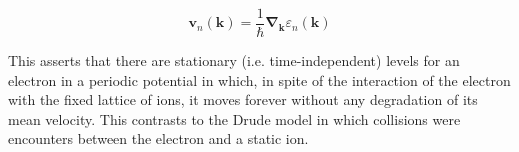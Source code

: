 		\begin{equation} \label{eq:mean_v}
			\mathbf{v}_n(\mathbf{k})
			= \frac{1}{\hbar}
			\boldsymbol{\nabla}_\mathbf{k}
			\varepsilon_n (\mathbf{k})
		\end{equation}

		 This asserts that there are stationary (i.e. time-independent) levels for an electron in a periodic potential in which, in spite of the interaction of the electron with the fixed lattice of ions, it moves forever without any degradation of its mean velocity. This contrasts to the Drude model in which collisions were encounters between the electron and a static ion. 

